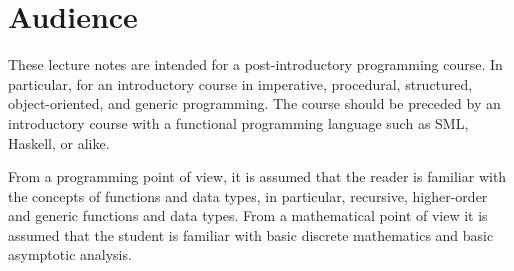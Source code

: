 \section*{Audience}

These lecture notes are intended for a post-introductory programming course. In
particular, for an introductory course in imperative, procedural, structured,
object-oriented, and generic programming. The course should be preceded by an
introductory course with a functional programming language such as SML,
Haskell, or alike.

From a programming point of view, it is assumed that the reader is familiar
with the concepts of functions and data types, in particular, recursive,
higher-order and generic functions and data types. From a mathematical point of
view it is assumed that the student is familiar with basic discrete mathematics
and basic asymptotic analysis.
